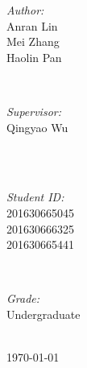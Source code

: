 \documentclass[journal, a4paper]{IEEEtran}
\begin{document}
\begin{titlepage}
\begin{minipage}{0.4\textwidth}
\begin{flushleft} \large
\emph{Author:}\\
Anran Lin\\ %
Mei Zhang\\
Haolin Pan
\end{flushleft}
\end{minipage}
~
\begin{minipage}{0.4\textwidth}
\begin{flushright} \large
\emph{Supervisor:} \\
Qingyao Wu %
\end{flushright}
\end{minipage}\\[2cm]
~
\begin{minipage}{0.4\textwidth}
\begin{flushleft} \large
\emph{Student ID:}\\
201630665045\\
201630666325\\
201630665441

\end{flushleft}
\end{minipage}
~
\begin{minipage}{0.4\textwidth}
\begin{flushright} \large
\emph{Grade:} \\
Undergraduate
\end{flushright}
\end{minipage}\\[2cm]



{\large \today}\\[2cm] %

 

\vfill %

\end{titlepage}
\end{document}
